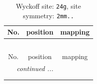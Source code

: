 \documentclass[fleqn,8pt]{jsarticle}
\begin{document}
\renewcommand{\arraystretch}{1.2}
\begin{longtable}{ccc}
\caption{Wyckoff site: {\tt 24g}, site symmetry: {\tt 2mm..}}
 \\
 \hline \hline
No. & position & mapping \\ \hline \endfirsthead

\multicolumn{2}{l}{\tablename\ \thetable{}} \\
 \hline \hline
No. & position & mapping \\ \hline \endhead

 \hline \hline
\multicolumn{2}{r}{\footnotesize\it continued ...} \\ \endfoot

 \hline \hline
\multicolumn{2}{r}{} \\ \endlastfoot


\end{longtable}
\end{document}
